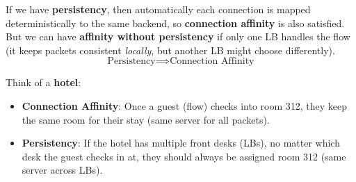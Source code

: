 If we have \textbf{persistency}, then automatically each connection is mapped deterministically to the same backend, so \textbf{connection affinity} is also satisfied. But we can have \textbf{affinity without persistency} if only one LB handles the flow (it keeps packets consistent \emph{locally}, but another LB might choose differently).
\begin{equation*}
    \text{Persistency} \implies \text{Connection Affinity}
\end{equation*}

\highspace
\begin{examplebox}[: Analogy]
    Think of a \textbf{hotel}:
    \begin{itemize}
        \item \textbf{Connection Affinity}: Once a guest (flow) checks into room 312, they keep the same room for their stay (same server for all packets).
        \item \textbf{Persistency}: If the hotel has multiple front desks (LBs), no matter which desk the guest checks in at, they should always be assigned room 312 (same server across LBs).
    \end{itemize}
\end{examplebox}

